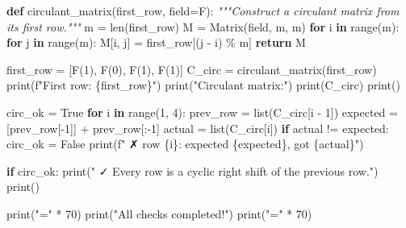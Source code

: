 \documentclass[
]{article}
\newenvironment{Shaded}{}{}
\newcommand{\BuiltInTok}[1]{\textcolor[rgb]{0.00,0.50,0.00}{#1}}
\newcommand{\CommentTok}[1]{\textcolor[rgb]{0.38,0.63,0.69}{\textit{#1}}}
\newcommand{\ControlFlowTok}[1]{\textcolor[rgb]{0.00,0.44,0.13}{\textbf{#1}}}
\newcommand{\DecValTok}[1]{\textcolor[rgb]{0.25,0.63,0.44}{#1}}
\newcommand{\KeywordTok}[1]{\textcolor[rgb]{0.00,0.44,0.13}{\textbf{#1}}}
\newcommand{\NormalTok}[1]{#1}
\newcommand{\OperatorTok}[1]{\textcolor[rgb]{0.40,0.40,0.40}{#1}}
\newcommand{\SpecialCharTok}[1]{\textcolor[rgb]{0.25,0.44,0.63}{#1}}
\newcommand{\SpecialStringTok}[1]{\textcolor[rgb]{0.73,0.40,0.53}{#1}}
\newcommand{\StringTok}[1]{\textcolor[rgb]{0.25,0.44,0.63}{#1}}
\newcommand{\VariableTok}[1]{\textcolor[rgb]{0.10,0.09,0.49}{#1}}
\begin{document}
\begin{Shaded}
\begin{Highlighting}[]
\KeywordTok{def}\NormalTok{ circulant\_matrix(first\_row, field}\OperatorTok{=}\NormalTok{F):}
    \CommentTok{"""Construct a circulant matrix from its first row."""}
\NormalTok{    m }\OperatorTok{=} \BuiltInTok{len}\NormalTok{(first\_row)}
\NormalTok{    M }\OperatorTok{=}\NormalTok{ Matrix(field, m, m)}
    \ControlFlowTok{for}\NormalTok{ i }\KeywordTok{in} \BuiltInTok{range}\NormalTok{(m):}
        \ControlFlowTok{for}\NormalTok{ j }\KeywordTok{in} \BuiltInTok{range}\NormalTok{(m):}
\NormalTok{            M[i, j] }\OperatorTok{=}\NormalTok{ first\_row[(j }\OperatorTok{{-}}\NormalTok{ i) }\OperatorTok{\%}\NormalTok{ m]}
    \ControlFlowTok{return}\NormalTok{ M}

\NormalTok{first\_row }\OperatorTok{=}\NormalTok{ [F(}\DecValTok{1}\NormalTok{), F(}\DecValTok{0}\NormalTok{), F(}\DecValTok{1}\NormalTok{), F(}\DecValTok{1}\NormalTok{)]}
\NormalTok{C\_circ }\OperatorTok{=}\NormalTok{ circulant\_matrix(first\_row)}
\BuiltInTok{print}\NormalTok{(}\SpecialStringTok{f"First row: }\SpecialCharTok{\{}\NormalTok{first\_row}\SpecialCharTok{\}}\SpecialStringTok{"}\NormalTok{)}
\BuiltInTok{print}\NormalTok{(}\StringTok{"Circulant matrix:"}\NormalTok{)}
\BuiltInTok{print}\NormalTok{(C\_circ)}
\BuiltInTok{print}\NormalTok{()}

\NormalTok{circ\_ok }\OperatorTok{=} \VariableTok{True}
\ControlFlowTok{for}\NormalTok{ i }\KeywordTok{in} \BuiltInTok{range}\NormalTok{(}\DecValTok{1}\NormalTok{, }\DecValTok{4}\NormalTok{):}
\NormalTok{    prev\_row }\OperatorTok{=} \BuiltInTok{list}\NormalTok{(C\_circ[i }\OperatorTok{{-}} \DecValTok{1}\NormalTok{])}
\NormalTok{    expected }\OperatorTok{=}\NormalTok{ [prev\_row[}\OperatorTok{{-}}\DecValTok{1}\NormalTok{]] }\OperatorTok{+}\NormalTok{ prev\_row[:}\OperatorTok{{-}}\DecValTok{1}\NormalTok{]}
\NormalTok{    actual }\OperatorTok{=} \BuiltInTok{list}\NormalTok{(C\_circ[i])}
    \ControlFlowTok{if}\NormalTok{ actual }\OperatorTok{!=}\NormalTok{ expected:}
\NormalTok{        circ\_ok }\OperatorTok{=} \VariableTok{False}
        \BuiltInTok{print}\NormalTok{(}\SpecialStringTok{f"  ✗ row }\SpecialCharTok{\{}\NormalTok{i}\SpecialCharTok{\}}\SpecialStringTok{: expected }\SpecialCharTok{\{}\NormalTok{expected}\SpecialCharTok{\}}\SpecialStringTok{, got }\SpecialCharTok{\{}\NormalTok{actual}\SpecialCharTok{\}}\SpecialStringTok{"}\NormalTok{)}

\ControlFlowTok{if}\NormalTok{ circ\_ok:}
    \BuiltInTok{print}\NormalTok{(}\StringTok{"  ✓ Every row is a cyclic right shift of the previous row."}\NormalTok{)}
\BuiltInTok{print}\NormalTok{()}

\BuiltInTok{print}\NormalTok{(}\StringTok{"="} \OperatorTok{*} \DecValTok{70}\NormalTok{)}
\BuiltInTok{print}\NormalTok{(}\StringTok{"All checks completed!"}\NormalTok{)}
\BuiltInTok{print}\NormalTok{(}\StringTok{"="} \OperatorTok{*} \DecValTok{70}\NormalTok{)}
\end{Highlighting}
\end{Shaded}
\end{document}
